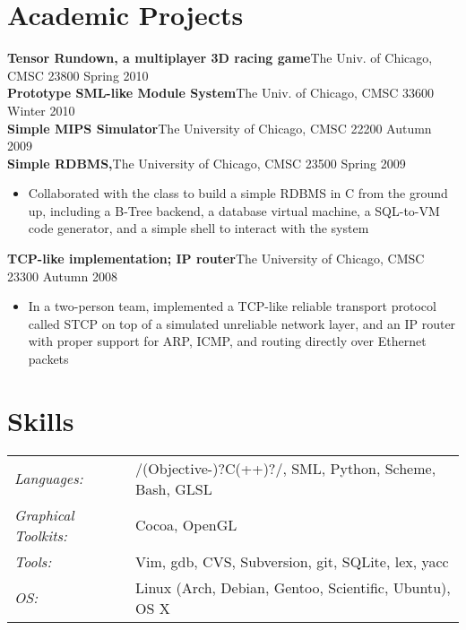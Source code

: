 \documentclass[line,overlapped]{res}
\begin{document}
\begin{resume}
\section{Academic Projects}
{\bf Tensor Rundown, a multiplayer 3D racing game}\footnotemark[2] The Univ. of Chicago, CMSC 23800 \hfill Spring 2010\\
{\bf Prototype SML-like Module System}\footnotemark[2] The Univ. of Chicago, CMSC 33600 \hfill Winter 2010\\
{\bf Simple MIPS Simulator}\footnotemark[2] The University of Chicago, CMSC 22200 \hfill Autumn 2009\\
{\bf Simple RDBMS,}\footnotemark[2] The University of Chicago, CMSC 23500 \hfill Spring 2009
\begin{itemize} \itemsep -2pt
    \item Collaborated with the class to build a simple RDBMS in C from the ground up, including a B-Tree backend, a database virtual machine, a SQL-to-VM code generator, and a simple shell to interact with the system
\end{itemize}
\vspace{-10pt}
{\bf TCP-like implementation; IP router}\footnotemark[2] The University of Chicago, CMSC 23300 \hfill Autumn 2008
\begin{itemize} \itemsep -2pt
    \item In a two-person team, implemented a TCP-like reliable transport protocol called STCP on top of a simulated unreliable network layer, and an IP router with proper support for ARP, ICMP, and routing directly over Ethernet packets
\end{itemize}


\section{Skills}
   \begin{tabular}{l p{4in}}
   {\sl Languages:}&/(Objective-)?C(++)?/, SML, Python, Scheme, Bash, GLSL\\
   {\sl Graphical Toolkits:}&Cocoa, OpenGL\\
   {\sl Tools: } & Vim, gdb, CVS, Subversion, git, SQLite, lex, yacc\\
   {\sl OS:} & Linux (Arch, Debian, Gentoo, Scientific, Ubuntu), OS X\\
 \end{tabular}

\end{resume}
\end{document}
